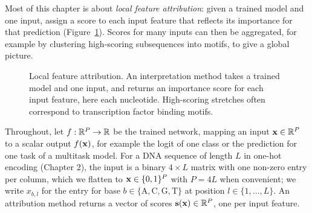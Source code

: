 Most of this chapter is about \emph{local feature attribution}: given a trained model and one input, assign a score to each input feature that reflects its importance for that prediction (Figure~\ref{fig:attribution_task}). Scores for many inputs can then be aggregated, for example by clustering high-scoring subsequences into motifs, to give a global picture.

\begin{figure}[t]
  \centering
  \caption{Local feature attribution. An interpretation method takes a trained model and one input, and returns an importance score for each input feature, here each nucleotide. High-scoring stretches often correspond to transcription factor binding motifs.}
  \label{fig:attribution_task}
\end{figure}

Throughout, let $f:\mathbb{R}^P\to\mathbb{R}$ be the trained network, mapping an input $\mathbf{x}\in\mathbb{R}^P$ to a scalar output $f(\mathbf{x})$, for example the logit of one class or the prediction for one task of a multitask model. For a DNA sequence of length $L$ in one-hot encoding (Chapter 2), the input is a binary $4\times L$ matrix with one non-zero entry per column, which we flatten to $\mathbf{x}\in\{0,1\}^P$ with $P=4L$ when convenient; we write $x_{b,l}$ for the entry for base $b\in\{\mathrm{A},\mathrm{C},\mathrm{G},\mathrm{T}\}$ at position $l\in\{1,\dots,L\}$. An attribution method returns a vector of scores $\mathbf{s}(\mathbf{x})\in\mathbb{R}^P$, one per input feature.

